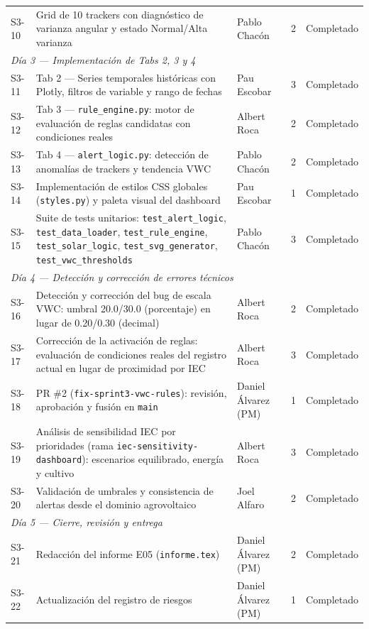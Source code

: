 \documentclass[11pt,a4paper]{article}
\begin{document}
\begin{longtable}{p{} p{} p{} p{} p{}}
S3-10 & Grid de 10 trackers con diagnóstico de varianza angular y estado Normal/Alta varianza & Pablo Chacón & 2 & Completado \\
\multicolumn{5}{l}{\textit{Día 3 — Implementación de Tabs 2, 3 y 4}} \\
S3-11 & Tab 2 — Series temporales históricas con Plotly, filtros de variable y rango de fechas & Pau Escobar & 3 & Completado \\
S3-12 & Tab 3 — \texttt{rule\_engine.py}: motor de evaluación de reglas candidatas con condiciones reales & Albert Roca & 2 & Completado \\
S3-13 & Tab 4 — \texttt{alert\_logic.py}: detección de anomalías de trackers y tendencia VWC & Pablo Chacón & 2 & Completado \\
S3-14 & Implementación de estilos CSS globales (\texttt{styles.py}) y paleta visual del dashboard & Pau Escobar & 1 & Completado \\
S3-15 & Suite de tests unitarios: \texttt{test\_alert\_logic}, \texttt{test\_data\_loader}, \texttt{test\_rule\_engine}, \texttt{test\_solar\_logic}, \texttt{test\_svg\_generator}, \texttt{test\_vwc\_thresholds} & Pablo Chacón & 3 & Completado \\
\multicolumn{5}{l}{\textit{Día 4 — Detección y corrección de errores técnicos}} \\
S3-16 & Detección y corrección del bug de escala VWC: umbral 20.0/30.0 (porcentaje) en lugar de 0.20/0.30 (decimal) & Albert Roca & 2 & Completado \\
S3-17 & Corrección de la activación de reglas: evaluación de condiciones reales del registro actual en lugar de proximidad por IEC & Albert Roca & 3 & Completado \\
S3-18 & PR \#2 (\texttt{fix-sprint3-vwc-rules}): revisión, aprobación y fusión en \texttt{main} & Daniel Álvarez (PM) & 1 & Completado \\
S3-19 & Análisis de sensibilidad IEC por prioridades (rama \texttt{iec-sensitivity-dashboard}): escenarios equilibrado, energía y cultivo & Albert Roca & 3 & Completado \\
S3-20 & Validación de umbrales y consistencia de alertas desde el dominio agrovoltaico & Joel Alfaro & 2 & Completado \\
\multicolumn{5}{l}{\textit{Día 5 — Cierre, revisión y entrega}} \\
S3-21 & Redacción del informe E05 (\texttt{informe.tex}) & Daniel Álvarez (PM) & 2 & Completado \\
S3-22 & Actualización del registro de riesgos & Daniel Álvarez (PM) & 1 & Completado \\

\end{longtable}
\end{document}
